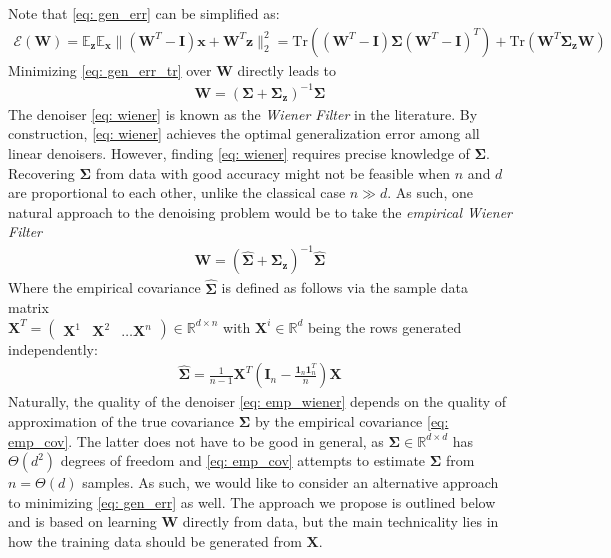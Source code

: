 \documentclass[final]{l4dc2026}
\newcommand{\bSigma}{\bm{\Sigma}}
\newcommand{\bI}{\mathbf{I}}
\newcommand{\bW}{\mathbf{W}}
\newcommand{\bX}{\mathbf{X}}
\newcommand{\bx}{\mathbf{x}}
\newcommand{\bz}{\mathbf{z}}
\newcommand{\bbE}{\mathbb{E}}
\newcommand{\bbR}{\mathbb{R}}
\newcommand{\calE}{\mathcal{E}}
\newcommand{\bone}{\mathbf{1}}
\newcommand{\tr}{\text{Tr}}
\begin{document}
\bigskip

Note that \eqref{eq: gen_err} can be simplified as:
\begin{align}\label{eq: gen_err_tr}
    \calE(\bW)=\bbE_\bz\bbE_\bx \|(\bW^T - \bI) \bx + \bW^T \bz\|_2^2 = \tr \left((\bW^T - \bI) \bSigma (\bW^T - \bI)^T\right) +  \tr\left( \bW^T \bSigma_\bz \bW\right)
\end{align}
Minimizing \eqref{eq: gen_err_tr} over $\bW$ directly leads to 
\begin{align}\label{eq: wiener}
    \bW = \left(\bSigma + \bSigma_\bz\right)^{-1}\bSigma
\end{align}
The denoiser \eqref{eq: wiener} is known as the {\it Wiener Filter} in the literature. By construction, \eqref{eq: wiener} achieves the optimal generalization error among all linear denoisers. However, finding \eqref{eq: wiener} requires precise knowledge of $\bSigma$. Recovering $\bSigma$ from data with good accuracy might not be feasible when $n$ and $d$ are proportional to each other, unlike the classical case $n \gg d$. As such, one natural approach to the denoising problem would be to take the {\it empirical Wiener Filter}
\begin{align}\label{eq: emp_wiener}
    \bW = \left(\hat{\bSigma} + \bSigma_\bz\right)^{-1}\hat{\bSigma}
\end{align}
Where the empirical covariance $\hat{\bSigma}$ is defined as follows via the sample data matrix 
\\ $\bX^T = \begin{pmatrix}
    \bX^1 & \bX^2 & \hdots \bX^n
\end{pmatrix}\allowbreak \in \bbR^{d \times n}$ with $\bX^i \in \bbR^d$ being the rows generated independently:
\begin{align}\label{eq: emp_cov}
    \hat{\bSigma} = \frac{1}{n-1}\bX^T\left(\bI_n - \frac{\bone_n\bone_n^T}{n}\right)\bX
\end{align}
Naturally, the quality of the denoiser \eqref{eq: emp_wiener} depends on the quality of approximation of the true covariance $\bSigma$ by the empirical covariance \eqref{eq: emp_cov}. The latter does not have to be good in general, as $\bSigma \in \bbR^{d \times d}$ has $\Theta(d^2)$ degrees of freedom and \eqref{eq: emp_cov} attempts to estimate $\bSigma$ from $n = \Theta(d)$ samples. As such, we would like to consider an alternative approach to minimizing \eqref{eq: gen_err} as well. The approach we propose is outlined below and is based on learning $\bW$ directly from data, but the main technicality lies in how the training data should be generated from $\bX$.  
\end{document}
